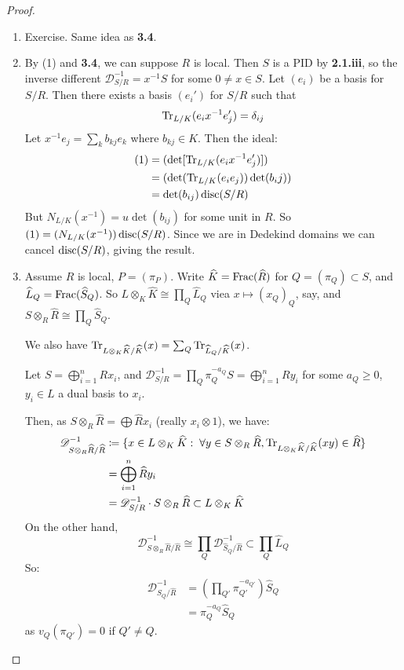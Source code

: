 \documentclass[10pt,a4paper]{article}
\begin{document}
\begin{proof}\hspace*{0cm}
  \begin{enumerate}
    \item Exercise. Same idea as \textbf{3.4}.
    \item By (1) and \textbf{3.4}, we can suppose $R$ is local. Then $S$ is a PID by \textbf{2.1.iii}, so the inverse different $\mathscr{D}^{-1}_{S/R} = x^{-1} S$ for some $0 \neq x \in S$. Let $(e_i)$ be a basis for $S/R$. Then there exists a basis $(e_i')$ for $S/R$ such that
    \[\operatorname{Tr}_{L/K}(e_i x^{-1} e'_j) = \delta_{ij}\]
    Let $x^{-1}e_j = \sum_{k} b_{kj}e_k$ where $b_{kj} \in K$. Then the ideal:
    \begin{align*}
      (1) &= (\det[\operatorname{Tr}_{L/K}(e_ix^{-1}e_j')]) \\
      &= (\det (\operatorname{Tr}_{L/K}(e_ie_j))\det(b_ij)) \\
      &= \det(b_{ij}) \operatorname{disc}(S/R)
    \end{align*}
    But $N_{L/K}(x^{-1}) = u \det(b_{ij})$ for some unit in $R$. So $(1) = (N_{L/K}(x^{-1}))\operatorname{disc}(S/R)$. Since we are in Dedekind domains we can cancel $\operatorname{disc}(S/R)$, giving the result.
    \item Assume $R$ is local, $P = (\pi_P)$. Write $\widehat{K} = \operatorname{Frac}(\widehat{R})$ for $Q = (\pi_Q) \subset S$, and $\widehat{L}_Q = \operatorname{Frac}(\widehat{S}_Q)$. So $L \otimes_K \hat{K} \cong \prod_Q \hat{L}_Q$ viea $x \mapsto (x_Q)_Q$, say, and $S \otimes_R \hat{R} \cong \prod_Q \hat{S}_Q$.

    We also have $\operatorname{Tr}_{L \otimes_K \widehat{K} / \widehat{K}} (x) = \sum_Q \operatorname{Tr}_{\widehat{L}_Q/\widehat{K}}(x)$.

    Let $S = \bigoplus_{i=1}^n R x_i$, and $\mathscr{D}_{S/R}^{-1} = \prod_Q \pi_Q^{-a_Q} S = \bigoplus_{i=1}^n Ry_i$ for some $a_Q \geq 0$, $y_i \in L$ a dual basis to $x_i$.

    Then, as $S\otimes_R \hat{R} = \bigoplus \hat{R}x_i$ (really $x_i \otimes 1$), we have:
    \begin{align*}
      \mathscr{D}^{-1}_{S\otimes_R \hat{R}/\hat{R}} &\coloneqq \{x \in L\otimes_K \hat{K} : \forall y\in S\otimes_R \hat{R}, \Tr_{L\otimes_K \hat{K}/\hat{K}}(xy) \in \hat{R}\}\\
      &= \bigoplus_{i=1}^n \hat{R}y_i\\
      &= \mathscr{D}^{-1}_{S/R}\cdot S \otimes_R \hat{R} \subset L\otimes_K \hat{K}
    \end{align*}
    On the other hand,
    \[\mathscr{D}^{-1}_{S\otimes_R \hat{R}/\hat{R}} \cong \prod_Q \mathscr{D}^{-1}_{\hat{S}_Q/\hat{R}} \subset \prod_Q \hat{L}_Q\]
    So:
    \begin{align*}
      \mathscr{D}^{-1}_{\hat{S}_Q/\hat{R}} &= (\prod_{Q'}\pi_{Q'}^{-a_{Q'}}) \hat{S}_Q\\
      &= \pi_Q^{-a_Q} \hat{S}_Q
    \end{align*}
    as $v_Q(\pi_{Q'}) = 0$ if $Q' \neq Q$.
  \end{enumerate}
\end{proof}
\end{document}
